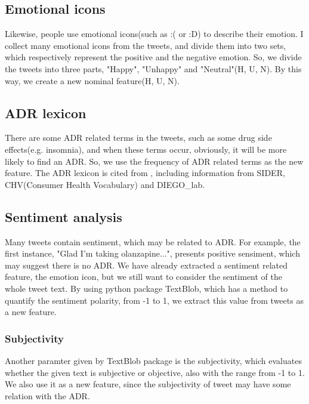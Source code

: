 \documentclass[11pt]{article}
\begin{document}
\subsection{Emotional icons}
Likewise, people use emotional icons(such as :( or :D)
to describe their emotion.
I collect many emotional icons from the tweets,
and divide them into two sets,
which respectively represent the positive and the negative emotion.
So, we divide the tweets into three parts,
"Happy", "Unhappy" and "Neutral"(H, U, N).
By this way, we create a new nominal feature(H, U, N).


\subsection{ADR lexicon}
There are some ADR related terms in the tweets,
such as some drug side effects(e.g. insomnia),
and when these terms occur, obviously,
it will be more likely to find an ADR.
So, we use the frequency of ADR related terms as the new feature.
The ADR lexicon is cited from ,
including information from SIDER,
CHV(Consumer Health Vocabulary) and DIEGO\_lab.

\subsection{Sentiment analysis}
Many tweets contain sentiment, which may be related to ADR.
For example, the first instance, "Glad I'm taking olanzapine...",
presents positive sensiment, which may suggest there is no ADR.
We have already extracted a sentiment related feature, the emotion icon,
but we still want to consider the sentiment of the whole tweet text.
By using python package TextBlob\cite{textblob},
which has a method to quantify the sentiment polarity, from -1 to 1,
we extract this value from tweets as a new feature.

\subsubsection{Subjectivity}
Another paramter given by TextBlob package
is the subjectivity,
which evaluates whether the given text is subjective or objective,
also with the range from -1 to 1.
We also use it as a new feature,
since the subjectivity of tweet may have some relation with the ADR.
\end{document}
